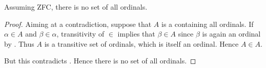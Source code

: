 \begin{theorem}\label{thm:burali_forti_paradox}
  Assuming ZFC, there is no set of all ordinals.
\end{theorem}
\begin{proof}
  Aiming at a contradiction, suppose that \( A \) is a containing all ordinals. If \( \alpha \in A \) and \( \beta \in \alpha \), transitivity of \( \in \) implies that \( \beta \in A \) since \( \beta \) is again an ordinal by . Thus \( A \) is a transitive set of ordinals, which  is itself an ordinal. Hence \( A \in A \).

  But this contradicts . Hence there is no set of all ordinals.
\end{proof}

